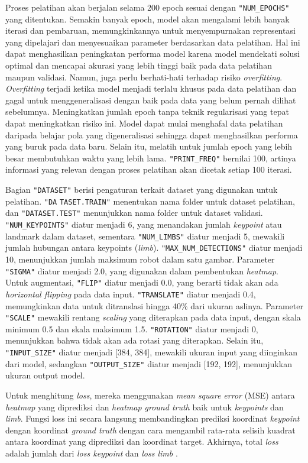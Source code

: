 Proses pelatihan akan berjalan selama 200 epoch sesuai dengan \verb|"NUM_EPOCHS"| yang ditentukan. Semakin banyak epoch, model akan mengalami lebih banyak iterasi dan pembaruan, memungkinkannya untuk menyempurnakan representasi yang dipelajari dan menyesuaikan parameter berdasarkan data pelatihan.
Hal ini dapat menghasilkan peningkatan performa model karena model mendekati solusi optimal dan mencapai akurasi yang lebih tinggi baik pada data pelatihan maupun validasi. Namun, juga perlu berhati-hati terhadap risiko \textit{overfitting}. \textit{Overfitting} terjadi ketika model menjadi terlalu khusus pada data pelatihan dan gagal untuk menggeneralisasi dengan baik pada data yang belum pernah dilihat sebelumnya.
Meningkatkan jumlah epoch tanpa teknik regularisasi yang tepat dapat meningkatkan risiko ini. Model dapat mulai menghafal data pelatihan daripada belajar pola yang digeneralisasi sehingga dapat menghasilkan performa yang buruk pada data baru. Selain itu, melatih untuk jumlah epoch yang lebih besar membutuhkan waktu yang lebih lama.
\verb|"PRINT_FREQ"| bernilai 100, artinya informasi yang relevan dengan proses pelatihan akan dicetak setiap 100 iterasi.

Bagian \verb|"DATASET"| berisi pengaturan terkait dataset yang digunakan untuk pelatihan.
\verb|"DA| \verb|TASET.TRAIN"| menentukan nama folder untuk dataset pelatihan, dan \verb|"DATASET.TEST"| menunjukkan nama folder untuk dataset validasi. \verb|"NUM_KEYPOINTS"| diatur menjadi 6, yang menandakan jumlah \textit{keypoint} atau landmark dalam dataset, sementara \verb|"NUM_LIMBS"| diatur menjadi 5, mewakili jumlah hubungan antara keypoints (\textit{limb}).
\verb|"MAX_NUM_DETECTIONS"| diatur menjadi 10, menunjukkan jumlah maksimum robot dalam satu gambar. Parameter \verb|"SIGMA"| diatur menjadi 2.0, yang digunakan dalam pembentukan \textit{heatmap}. Untuk augmentasi, \verb|"FLIP"| diatur menjadi 0.0, yang berarti tidak akan ada \textit{horizontal flipping} pada data input. \verb|"TRANSLATE"| diatur menjadi 0.4, memungkinkan data untuk ditranslasi hingga 40\% dari ukuran aslinya.
Parameter \verb|"SCALE"| mewakili rentang \textit{scaling} yang diterapkan pada data input, dengan skala minimum 0.5 dan skala maksimum 1.5. \verb|"ROTATION"| diatur menjadi 0, menunjukkan bahwa tidak akan ada rotasi yang diterapkan. Selain itu, \verb|"INPUT_SIZE"| diatur menjadi [384, 384], mewakili ukuran input yang diinginkan dari model, sedangkan \verb|"OUTPUT_SIZE"| diatur menjadi [192, 192], menunjukkan ukuran output model.

Untuk menghitung \textit{loss}, mereka menggunakan \textit{mean square error} (MSE) antara \textit{heatmap} yang diprediksi dan \textit{heatmap ground truth} baik untuk \textit{keypoints} dan \textit{limb}.
Fungsi loss ini secara langsung membandingkan prediksi koordinat \textit{keypoint} dengan koordinat \textit{ground truth} dengan cara mengambil rata-rata selisih kuadrat antara koordinat yang diprediksi dan koordinat target.
Akhirnya, total \textit{loss} adalah jumlah dari \textit{loss keypoint} dan \textit{loss limb} \parencite{amini2021}.

